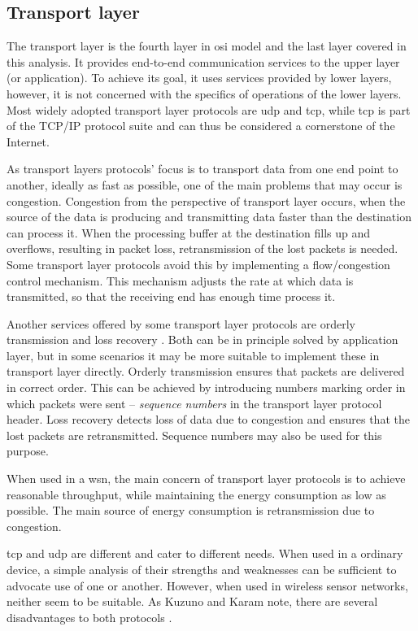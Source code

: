 \subsection{Transport layer}
The transport layer is the fourth layer in \acrshort{osi} model and the last layer covered in this analysis. It provides end-to-end communication services to the upper layer (or application)\cite{Braden1989RequirementsLayers}. To achieve its goal, it uses services provided by lower layers, however, it is not concerned with the specifics of operations of the lower layers. Most widely adopted transport layer protocols are \acrshort{udp} and \acrshort{tcp}, while \acrshort{tcp} is part of the TCP/IP protocol suite and can thus be considered a cornerstone of the Internet.

As transport layers protocols' focus is to transport data from one end point to another, ideally as fast as possible, one of the main problems that may occur is congestion. Congestion from the perspective of transport layer occurs, when the source of the data is producing and transmitting data faster than the destination can process it. When the processing buffer at the destination fills up and overflows, resulting in packet loss, retransmission of the lost packets is needed. Some transport layer protocols avoid this by implementing a flow/congestion control mechanism. This mechanism adjusts the rate at which data is transmitted, so that the receiving end has enough time process it.

Another services offered by some transport layer protocols are orderly transmission and loss recovery \cite{Kuzuno2017BlockchainBitcoin}. Both can be in principle solved by application layer, but in some scenarios it may be more suitable to implement these in transport layer directly. Orderly transmission ensures that packets are delivered in correct order. This can be achieved by introducing numbers marking order in which packets were sent -- \textit{sequence numbers} in the transport layer protocol header. Loss recovery detects loss of data due to congestion and ensures that the lost packets are retransmitted. Sequence numbers may also be used for this purpose.

When used in a \acrshort{wsn}, the main concern of transport layer protocols is to achieve reasonable throughput, while maintaining the energy consumption as low as possible. The main source of energy consumption is retransmission due to congestion.

\acrshort{tcp} and \acrshort{udp} are different and cater to different needs. When used in a ordinary device, a simple analysis of their strengths and weaknesses can be sufficient to advocate use of one or another. However, when used in wireless sensor networks, neither seem to be suitable. As Kuzuno and Karam note, there are several disadvantages to both protocols \cite{Kuzuno2017BlockchainBitcoin}.